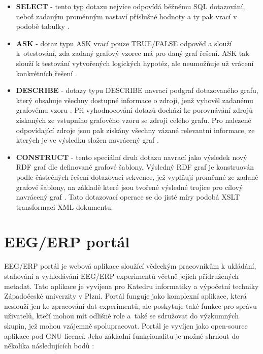 \documentclass{projekt}
\begin{document}
\begin {itemize}

\item \textbf{SELECT} - tento typ dotazu nejvíce odpovídá běžnému SQL dotazování, neboť zadaným proměnným nastaví příslušné hodnoty a ty pak vrací v podobě tabulky \cite{_14}.
\item \textbf{ASK} - dotaz typu ASK vrací pouze TRUE/FALSE odpověď a slouží k~otestování, zda zadaný grafový vzorec má pro daný graf řešení. ASK tak slouží k testování vytvořených logických hypotéz, ale neumožňuje už vrácení konkrétních řešení \cite{_32}.
\item \textbf{DESCRIBE} - dotazy typu DESCRIBE navrací podgraf dotazovaného grafu, který obsahuje všechny dostupné informace o zdroji, jenž vyhověl zadanému grafovému vzoru \cite{_13}. Při vyhodnocování dotazů dochází ke porovnávání zdrojů získaných ze vstupního grafového vzoru se zdroji celého grafu. Pro nalezené odpovídající zdroje jsou pak získány všechny vázané relevantní informace, ze kterých je ve výsledku složen navrácený graf \cite{_14}.
\item \textbf{CONSTRUCT} - tento speciální druh dotazu navrací jako výsledek nový RDF graf dle definované grafové šablony. Výsledný RDF graf je konstruován podle částečných řešení dotazovací sekvence, jež vyplňují proměnné ze zadané grafové šablony, na základě které jsou tvořené výsledné trojice pro cílový navrácený graf \cite{_32}. Tato dotazovací operace se do jisté míry podobá XSLT transformaci XML dokumentu.

\end {itemize}

\chapter{EEG/ERP portál}
\hspace{0.65cm}EEG/ERP portál je webová aplikace sloužící vědeckým pracovníkům k ukládání, stahování a vyhledávání EEG/ERP experimentů včetně jejich přidružených metadat. Tato aplikace je vyvíjena pro Katedru informatiky a výpočetní techniky Západočeské univerzity v Plzni. Portál funguje jako komplexní aplikace, která neslouží jen ke zpracování dat experimentů, ale poskytuje také funkce pro správu uživatelů, kteří mohou mít odlišné role a~také se sdružovat do výzkumných skupin, jež mohou vzájemně spolupracovat. Portál je vyvíjen jako open-source aplikace pod GNU licencí. Jeho základní funkcionalitu je možné shrnout do několika následujících bodů \cite{_15}:
\end{document}
